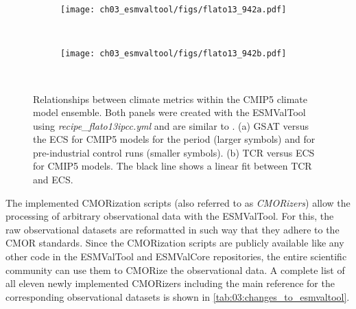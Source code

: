 \begin{figure}[t]
  \centering
  \begin{subfigure}[b]{0.35\columnwidth}
    \texttt{[image: ch03\_esmvaltool/figs/flato13\_942a.pdf]}
    \caption{}
    \label{fig:03:flato13:a}
  \end{subfigure}
  ~
  \begin{subfigure}[b]{0.35\columnwidth}
    \texttt{[image: ch03\_esmvaltool/figs/flato13\_942b.pdf]}
    \caption{}
    \label{fig:03:flato13:b}
  \end{subfigure}
  ~
  \begin{subfigure}[b]{0.25\columnwidth}
  \end{subfigure}
  \caption{Relationships between climate metrics within the \acs{CMIP}5 climate
    model ensemble. Both panels were created with the \acs{ESMValTool} using
    \emph{recipe\_flato13ipcc.yml} and are similar to \textcite{Flato2013}. (a)
    \Acf{GSAT} versus the \acf{ECS} for \acs{CMIP}5 models for the period
     (larger symbols) and for pre-industrial control runs
    (smaller symbols). (b) \acf{TCR} versus \acs{ECS} for \acs{CMIP}5 models.
    The black line shows a linear fit between \acs{TCR} and \acs{ECS}.}
  \label{fig:03:flato13}
\end{figure}

The implemented \ac{CMOR}ization scripts (also referred to as
\emph{\ac{CMOR}izers}) allow the processing of arbitrary observational data
with the \ac{ESMValTool}. For this, the raw observational datasets are
reformatted in such way that they adhere to the \ac{CMOR} standards. Since the
\ac{CMOR}ization scripts are publicly available like any other code in the
\ac{ESMValTool} and \ac{ESMValCore} repositories, the entire scientific
community can use them to \ac{CMOR}ize the observational data. A complete list
of all eleven newly implemented \ac{CMOR}izers including the main reference for
the corresponding observational datasets is shown in
\cref{tab:03:changes_to_esmvaltool}.
